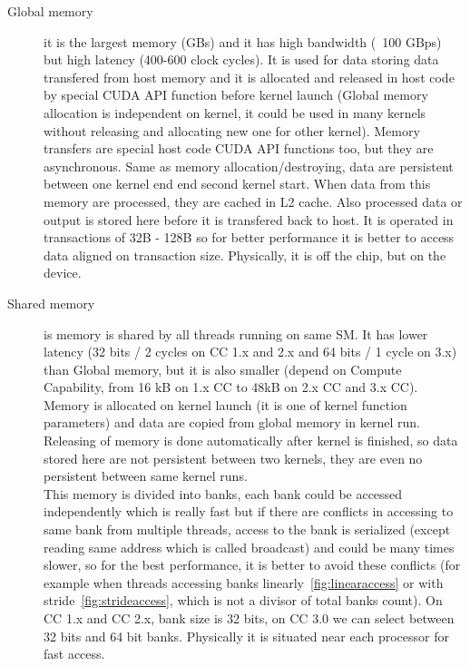 \begin{description}
\item[Global memory] it is the largest memory (GBs) and it has high bandwidth (~100 GBps) but high latency (400-600 clock cycles). It is used for data storing data transfered from host memory and it is allocated and released in host code by special CUDA API function before kernel launch (Global memory allocation is independent on kernel, it could be used in many kernels without releasing and allocating new one for other kernel). Memory transfers are special host code CUDA API functions too, but they are asynchronous. Same as memory allocation/destroying, data are persistent between one kernel end end second kernel start. When data from this memory are processed, they are cached in L2 cache. Also processed data or output is stored here before it is transfered back to host. It is operated in transactions of 32B - 128B so for better performance it is better to access data aligned on transaction size. Physically, it is off the chip, but on the device.
\item[Shared memory] is memory is shared by all threads running on same SM. It has lower latency (32 bits / 2 cycles on CC 1.x and 2.x and 64 bits / 1 cycle on 3.x) than Global memory, but it is also smaller (depend on Compute Capability, from 16 kB on 1.x CC to 48kB on 2.x CC and 3.x CC). Memory is allocated on kernel launch (it is one of kernel function parameters) and data are copied from global memory in kernel run. Releasing of memory is done automatically after kernel is finished, so data stored here are not persistent between two kernels, they are even no persistent between same kernel runs.\\
This memory is divided into banks, each bank could be accessed independently which is really fast but if there are conflicts in accessing to same bank from multiple threads, access to the bank is serialized (except reading same address which is called broadcast) and could be many times slower, so for the best performance, it is better to avoid these conflicts (for example when threads accessing banks linearly~\ref{fig:linearaccess} or with stride~\ref{fig:strideaccess}, which is not a divisor of total banks count). On CC 1.x and CC 2.x, bank size is 32 bits, on CC 3.0 we can select between 32 bits and 64 bit banks. Physically it is situated near each processor for fast access.
\end{description}

